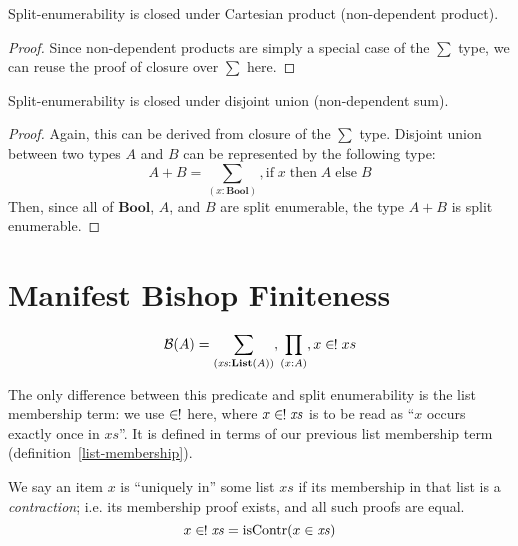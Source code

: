 \begin{lemma}
  Split-enumerability is closed under Cartesian product (non-dependent product).
\end{lemma} 
\begin{proof}
  Since non-dependent products are simply a special case of the \(\sum\) type,
  we can reuse the proof of closure over \(\sum\) here.
\end{proof}
\begin{lemma}
  Split-enumerability is closed under disjoint union (non-dependent sum).
\end{lemma}
\begin{proof}
  Again, this can be derived from closure of the \(\sum\) type.
  Disjoint union between two types \(A\) and \(B\) can be represented by the
  following type:
  \begin{equation}
    A + B = \sum_{(x : \mathbf{Bool})} , \text{if} \; x \; \text{then} \; A \; \text{else} \; B
  \end{equation}
  Then, since all of \(\mathbf{Bool}\), \(A\), and \(B\) are split enumerable,
  the type \(A + B\) is split enumerable.
\end{proof}
\section{Manifest Bishop Finiteness} \label{manifest-bishop}
\begin{definition}
  \begin{equation}
    \mathcal{B}(A) = \sum_{(\mathit{xs} : \textbf{List}(A))} , \prod_{(x : A)} , x \inunique xs
  \end{equation}
\end{definition}
The only difference between this predicate and split enumerability is the list
membership term: we use \(\inunique\) here, where \(x \inunique \mathit{xs}\) is
to be read as ``\(x\) occurs exactly once in \(\mathit{xs}\)''.
It is defined in terms of our previous list membership term
(definition~\ref{list-membership}).
\begin{definition}
  We say an item \(x\) is ``uniquely in'' some list \(\mathit{xs}\) if its
  membership in that list is a \emph{contraction}; i.e. its membership proof
  exists, and all such proofs are equal.
  \begin{equation}
    x \inunique \mathit{xs} = \text{isContr}(x \in \mathit{xs})
  \end{equation}
\end{definition}

